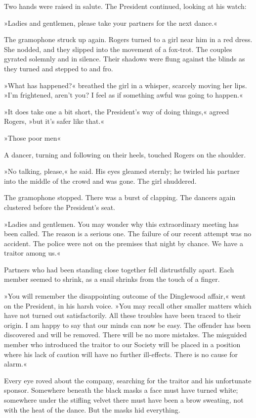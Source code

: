 Two hands were raised in salute. The President continued, looking at his watch:

»Ladies and gentlemen, please take your partners for the next dance.«

The gramophone struck up again. Rogers turned to a girl near him in a red dress. She nodded, and they slipped into the movement of a fox-trot. The couples gyrated solemnly and in silence. Their shadows were flung against the blinds as they turned and stepped to and fro.

»What has happened?« breathed the girl in a whisper, scarcely moving her lips. »I'm frightened, aren't you? I feel as if something awful was going to happen.«

»It does take one a bit short, the President's way of doing things,« agreed Rogers, »but it's safer like that.«

»Those poor men\longdash«

A dancer, turning and following on their heels, touched Rogers on the shoulder.

»No talking, please,« he said. His eyes gleamed sternly; he twirled his partner into the middle of the crowd and was gone. The girl shuddered.

The gramophone stopped. There was a burst of clapping. The dancers again clustered before the President's seat.

»Ladies and gentlemen. You may wonder why this extraordinary meeting has been called. The reason is a serious one. The failure of our recent attempt was no accident. The police were not on the premises that night by chance. We have a traitor among us.«

Partners who had been standing close together fell distrustfully apart. Each member seemed to shrink, as a snail shrinks from the touch of a finger.

»You will remember the disappointing outcome of the Dinglewood affair,« went on the President, in his harsh voice. »You may recall other smaller matters which have not turned out satisfactorily. All these troubles have been traced to their origin. I am happy to say that our minds can now be easy. The offender has been discovered and will be removed. There will be no more mistakes. The misguided member who introduced the traitor to our Society will be placed in a position where his lack of caution will have no further ill-effects. There is no cause for alarm.«

Every eye roved about the company, searching for the traitor and his unfortunate sponsor. Somewhere beneath the black masks a face must have turned white; somewhere under the stifling velvet there must have been a brow sweating, not with the heat of the dance. But the masks hid everything.

